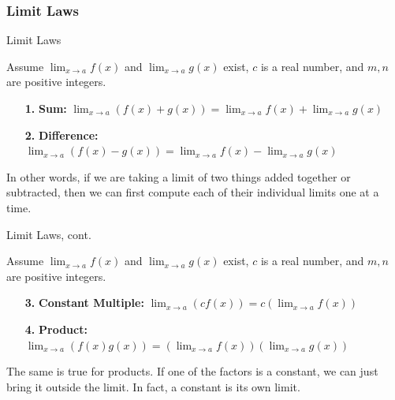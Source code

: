 \documentclass[cal1spr16Lectures.tex]{subfiles}
\begin{document}
\subsubsection{Limit Laws}\small
\begin{frame}{\small Limit Laws}{}
{\footnotesize Assume $\lim_{x \to a} f(x)$ and $\lim_{x \to a} g(x)$ exist, $c$ is a real number, and $m,n$ are positive integers.

\hrulefill
}
\begin{itemize}
\item[{\bf 1.}] {\bf Sum:} $\lim_{x \to a}\left(f(x)+g(x)\right) = \lim_{x \to a} f(x)+\lim_{x \to a} g(x)$

\vspace{1pc}
\item[{\bf 2.}] {\bf Difference:} $\lim_{x \to a}\left(f(x)-g(x)\right) = \lim_{x \to a} f(x)-\lim_{x \to a} g(x)$
\end{itemize}

\vspace{0.75pc}
In other words, if we are taking a limit of two things added together or subtracted, then we can first compute each of their individual limits one at a time.
\end{frame}

\begin{frame}{\small Limit Laws, cont.}{}
{\footnotesize Assume $\lim_{x \to a} f(x)$ and $\lim_{x \to a} g(x)$ exist, $c$ is a real number, and $m,n$ are positive integers.

\hrulefill
}
\begin{itemize}
\item[{\bf 3.}] {\bf Constant Multiple:} $\lim_{x \to a}\left(cf(x)\right) = c\left(\lim_{x \to a}f(x)\right)$

\vspace{1pc}
\item[{\bf 4.}] {\bf Product:}  $\lim_{x \to a}\left(f(x)g(x)\right) = \left(\lim_{x \to a} f(x)\right) \left(\lim_{x \to a} g(x)\right)$
\end{itemize}

\vspace{1.25pc}
The same is true for products.  If one of the factors is a constant, we can just bring it outside the limit.  In fact, a constant is its own limit.
\end{frame}
\end{document}
